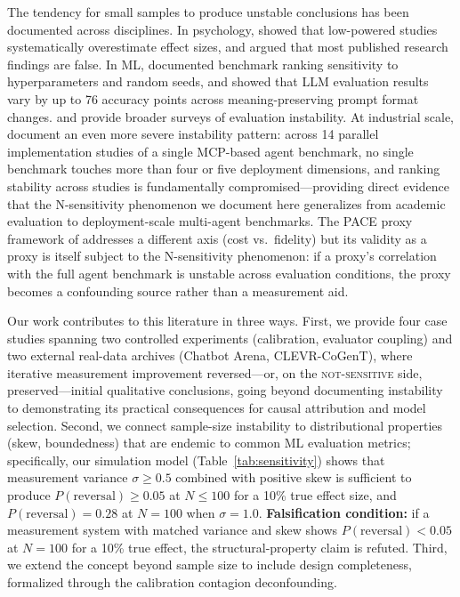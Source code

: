 \documentclass[11pt]{article}
\begin{document}
The tendency for small samples to produce unstable conclusions has been documented across disciplines. In psychology, \citet{button2013power} showed that low-powered studies systematically overestimate effect sizes, and \citet{ioannidis2005most} argued that most published research findings are false. In ML, \citet{dodge2019reproducibility} documented benchmark ranking sensitivity to hyperparameters and random seeds, and \citet{sclar2024quantifying} showed that LLM evaluation results vary by up to 76 accuracy points across meaning-preserving prompt format changes. \citet{luccioni2024estimating} and \citet{liang2023holistic} provide broader surveys of evaluation instability. At industrial scale, \citet{patel2026leaderboards} document an even more severe instability pattern: across 14 parallel implementation studies of a single MCP-based agent benchmark, no single benchmark touches more than four or five deployment dimensions, and ranking stability across studies is fundamentally compromised---providing direct evidence that the N-sensitivity phenomenon we document here generalizes from academic evaluation to deployment-scale multi-agent benchmarks. The PACE proxy framework of \citet{song2026pace} addresses a different axis (cost vs.\ fidelity) but its validity as a proxy is itself subject to the N-sensitivity phenomenon: if a proxy's correlation with the full agent benchmark is unstable across evaluation conditions, the proxy becomes a confounding source rather than a measurement aid.

Our work contributes to this literature in three ways. First, we provide four case studies spanning two controlled experiments (calibration, evaluator coupling) and two external real-data archives (Chatbot Arena, CLEVR-CoGenT), where iterative measurement improvement reversed---or, on the \textsc{not-sensitive} side, preserved---initial qualitative conclusions, going beyond documenting instability to demonstrating its practical consequences for causal attribution and model selection. Second, we connect sample-size instability to distributional properties (skew, boundedness) that are endemic to common ML evaluation metrics; specifically, our simulation model (Table~\ref{tab:sensitivity}) shows that measurement variance $\sigma \geq 0.5$ combined with positive skew is sufficient to produce $P(\text{reversal}) \geq 0.05$ at $N \leq 100$ for a 10\% true effect size, and $P(\text{reversal}) = 0.28$ at $N{=}100$ when $\sigma{=}1.0$. \textbf{Falsification condition:} if a measurement system with matched variance and skew shows $P(\text{reversal}) < 0.05$ at $N{=}100$ for a 10\% true effect, the structural-property claim is refuted. Third, we extend the concept beyond sample size to include design completeness, formalized through the calibration contagion deconfounding.
\end{document}

